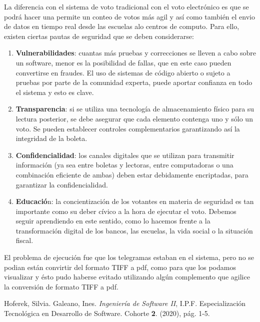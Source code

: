 \documentclass[titlepage,a4paper,twoside]{article}
\theoremstyle{definition}
\numberwithin{algorithm}{section}
\theoremstyle{remark}
\numberwithin{equation}{section}
\begin{document}
    
    
    La diferencia con el sistema de voto tradicional con el voto electrónico es que se podrá hacer una permite un conteo de votos más agil y así como también el envio de datos en tiempo real desde las escuelas alo centros de computo. Para ello, existen ciertas pautas de seguridad que se deben considerarse:
    
    \begin{enumerate}
    	\item \textbf{Vulnerabilidades}: cuantas más pruebas y correcciones se lleven a cabo sobre un software, menor es la posibilidad de fallas, que en este caso pueden convertirse en fraudes. El uso de sistemas de código abierto o sujeto a pruebas por parte de la comunidad experta, puede aportar confianza en todo el sistema y esto es clave.
    	
    	\item \textbf{Transparencia}: si se utiliza una tecnología de almacenamiento físico para su lectura posterior, se debe asegurar que cada elemento contenga uno y sólo un voto. Se pueden establecer controles complementarios garantizando así la integridad de la boleta.
    	
    	\item \textbf{Confidencialidad}: los canales digitales que se utilizan para transmitir información (ya sea entre boletas y lectoras, entre computadoras o una combinación eficiente de ambas) deben estar debidamente encriptadas, para garantizar la confidencialidad.
    	
    	\item \textbf{Educació}n: la concientización de los votantes en materia de seguridad es tan importante como su deber cívico a la hora de ejecutar el voto. Debemos seguir aprendiendo en este sentido, como lo hacemos frente a la transformación digital de los bancos, las escuelas, la vida social o la situación fiscal.
    \end{enumerate}
    El problema de ejecución fue que los telegramas estaban en el sistema, pero no se podian están convirtir del formato TIFF a pdf, como para que los podamos visualizar y ésto pudo haberse evitado utilizando algún complemento que agilice la conversión de formato TIFF a pdf. 
    
    
    
    
    

\begin{thebibliography}{99}
	 Hoferek, Silvia. Galeano, Ines. \textit{Ingeniería de Software II}, I.P.F. Especialización Tecnológica en Desarrollo de Software. Cohorte {\bf 2}. (2020),
	pág. 1-5.
\end{thebibliography}
\end{document}
